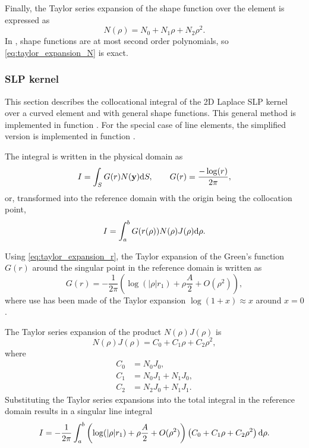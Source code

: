 Finally, the Taylor series expansion of the shape function over the element is expressed as
%
\begin{equation}
	N(\rho) = N_0 + N_1 \rho + N_2 \rho^2
	.
	\label{eq:taylor_expansion_N}
\end{equation}
%
In \NiHu{}, shape functions are at most second order polynomials, so \eqref{eq:taylor_expansion_N} is exact.


\subsubsection{SLP kernel}

This section describes the collocational integral of the 2D Laplace SLP kernel over a curved element and with general shape functions.
This general method is implemented in function .
For the special case of line elements, the simplified version is implemented in function .

The integral is written in the physical domain as
%
\begin{equation}
	I = \int_S G(r) N({\bf y}) \mathrm{d} S, \qquad G(r) = \frac{-\log(r)}{2\pi}
	,
\end{equation}
%
or, transformed into the reference domain with the origin being the collocation point,
%
\begin{equation}
	I = \int_a^b G(r(\rho)) N(\rho) J(\rho) \mathrm{d} \rho
	.
\end{equation}

Using \eqref{eq:taylor_expansion_r}, the Taylor expansion of the Green's function $G(r)$ around the singular point in the reference domain is written as
%
\begin{equation}
	G(r) = -\frac{1}{2\pi} \left(
		\log (|\rho| r_1) + \rho \frac{A}{2} + O(\rho^2)
		\right)
	,
\end{equation}
%
where use has been made of the Taylor expansion $\log(1+x) \approx x$ around $x=0$.

The Taylor series expansion of the product $N(\rho) J(\rho)$ is
%
\begin{equation}
	N(\rho) J(\rho) = C_0 + C_1 \rho + C_2 \rho^2
	,
\end{equation}
%
where
%
\begin{align}
	C_0 &= N_0 J_0, \\
	C_1 &= N_0 J_1 + N_1 J_0, \\
	C_2 &= N_2 J_0 + N_1 J_1.
\end{align}
%
Substituting the Taylor series expansions into the total integral in the reference domain results in a singular line integral
%
\begin{equation}
	I = -\frac{1}{2\pi} \int_{a}^{b}
	 \left(
		\log (|\rho| r_1) + \rho \frac{A}{2} + O(\rho^2)
	\right)
	\left( C_0 + C_1 \rho + C_2 \rho^2 \right) \mathrm{d}\rho
	.
\end{equation}

